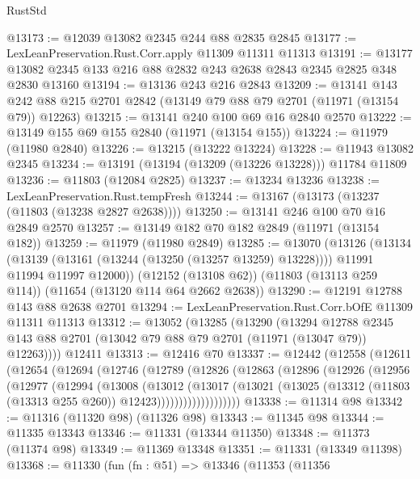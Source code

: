 \begin{lexlean}{RustStd}
\begin{coremodule}
@13173 := @12039 @13082 @2345 @244 @88 @2835 @2845
@13177 := LexLeanPreservation.Rust.Corr.apply @11309 @11311 @11313
@13191 := @13177 @13082 @2345 @133 @216 @88 @2832 @243 @2638 @2843 @2345 @2825 @348 @2830 @13160
@13194 := @13136 @243 @216 @2843
@13209 := @13141
    @143
    @242
    @88
    @215
    @2701
    @2842
    (@13149 @79 @88 @79 @2701 (@11971 (@13154 @79)) @12263)
@13215 := @13141 @240 @100 @69 @16 @2840 @2570
@13222 := @13149 @155 @69 @155 @2840 (@11971 (@13154 @155))
@13224 := @11979 (@11980 @2840)
@13226 := @13215 (@13222 @13224)
@13228 := @11943 @13082 @2345
@13234 := @13191 (@13194 (@13209 (@13226 @13228))) @11784 @11809
@13236 := @11803 (@12084 @2825)
@13237 := @13234 @13236
@13238 := LexLeanPreservation.Rust.tempFresh
@13244 := @13167 (@13173 (@13237 (@11803 (@13238 @2827 @2638))))
@13250 := @13141 @246 @100 @70 @16 @2849 @2570
@13257 := @13149 @182 @70 @182 @2849 (@11971 (@13154 @182))
@13259 := @11979 (@11980 @2849)
@13285 := @13070
    (@13126
      (@13134
        (@13139 (@13161 (@13244 (@13250 (@13257 @13259) @13228))))
        @11991
        @11994
        @11997
        @12000))
    (@12152 (@13108 @62))
    (@11803 (@13113 @259 @114))
    (@11654 (@13120 @114 @64 @2662 @2638))
@13290 := @12191 @12788 @143 @88 @2638 @2701
@13294 := LexLeanPreservation.Rust.Corr.bOfE @11309 @11311 @11313
@13312 := @13052
    (@13285
      (@13290
        (@13294
          @12788
          @2345
          @143
          @88
          @2701
          (@13042 @79 @88 @79 @2701 (@11971 (@13047 @79)) @12263))))
    @12411
@13313 := @12416 @70
@13337 := @12442
    (@12558
      (@12611
        (@12654
          (@12694
            (@12746
              (@12789
                (@12826
                  (@12863
                    (@12896
                      (@12926
                        (@12956
                          (@12977
                            (@12994
                              (@13008
                                (@13012
                                  (@13017
                                    (@13021
                                      (@13025
                                        (@13312
                                          (@11803 (@13313 @255 @260))
                                          @12423)))))))))))))))))))
@13338 := @11314 @98
@13342 := @11316 (@11320 @98) (@11326 @98)
@13343 := @11345 @98
@13344 := @11335 @13343
@13346 := @11331 (@13344 @11350)
@13348 := @11373 (@11374 @98)
@13349 := @11369 @13348
@13351 := @11331 (@13349 @11398)
@13368 := @11330
    (fun (fn : @51) =>
    @13346
      (@11353
        (@11356

\end{coremodule}
\end{lexlean}
